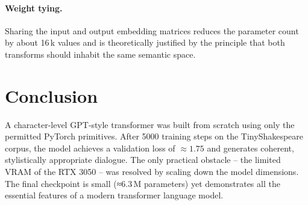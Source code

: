 \documentclass[12pt, a4paper]{article}
\begin{document}
\paragraph{Weight tying.}
Sharing the input and output embedding matrices reduces the parameter count by about 16 k values and is theoretically justified by the principle that both transforms should inhabit the same semantic space.

\section{Conclusion}

A character‑level GPT‑style transformer was built from scratch using only the permitted PyTorch primitives. After 5000 training steps on the TinyShakespeare corpus, the model achieves a validation loss of $\approx 1.75$ and generates coherent, stylistically appropriate dialogue. The only practical obstacle – the limited VRAM of the RTX 3050 – was resolved by scaling down the model dimensions. The final checkpoint is small (≈6.3 M parameters) yet demonstrates all the essential features of a modern transformer language model.
\end{document}
